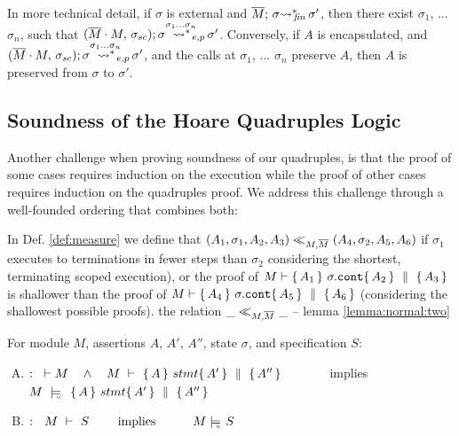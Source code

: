 In more technical detail, if $\sigma$ is external and $ \leadstoBoundedStarFin {\Mtwo}  {\sigma}  {\sigma'}$, 
then there exist $\sigma_1$, ... $\sigma_n$, such that
 $\WithExtPub {\Mtwo\cdot M} {\sigma\bd}  {\sigma}  {\sigma'} {\sigma_1...\sigma_n}$.
 Conversely, if $A$ is encapsulated, 
 and $\WithExtPub {\Mtwo\cdot M} {\sigma\bd}  {\sigma}  {\sigma'} {\sigma_1...\sigma_n}$, and 
 the calls at  $\sigma_1$, ... $\sigma_n$ preserve $A$,  then $A$ is preserved from $\sigma$ to $\sigma'$.
  



\subsection{ Soundness of the Hoare Quadruples Logic}

Another challenge when proving soundness of our quadruples, is that the proof of some cases  requires induction on the execution while the proof of other cases  requires induction on the quadruples
proof.  We address this challenge  through  a well-founded ordering that combines both:


\label{sect:prove:wellfounded}
\label{sect:prove:sound:quadruples}

In Def.  \ref{def:measure}  we define that $(A_1,\sigma_1,A_2, A_3) \ll_{M,\Mtwo}  (A_4,\sigma_2,A_5, A_6)$ if $\sigma_1$ executes to terminations in fewer steps than $\sigma_2$ considering the shortest, terminating scoped execution), or  the proof of $M \vdash \quadruple {A_1} {\sigma.\prg{cont}} {A_2} {A_3} $
is shallower than the  proof of  $M \vdash \quadruple {A_4} {\sigma.\prg{cont}} {A_5} {A_6} $ (considering the shallowest possible proofs).  
the relation $\_ \ll_{M,\Mtwo}  \_$  -- \cf lemma \ref{lemma:normal:two}
 

\begin{theorem}
\label{t:quadruple:sound}
\label{thm:soundness}
For module  $M$,   assertions $A$, $A'$, $A''$,   state  $\sigma$, and specification $S$:

\begin{enumerate}[(A)]
\item
 $:\strut \   \vdash M  \ \ \ \wedge \ \ \  M\ \vdash\  \quadruple {A} {stmt} {A'} {A''}$ \ \ \ \ \ \ \ \mbox{implies}\ \ \ \ \ \  \ \ \ $M\ \modelsD\  \quadruple {A} {stmt} {A'} {A''}$
 \item
  $:\strut \  \  \proves{M}{S}\ \ \ \ \ \ \ \mbox{implies}\ \ \ \ \ \  \ \ \ {M} \modelsD {S}$
 
\end{enumerate}

\end{theorem}

